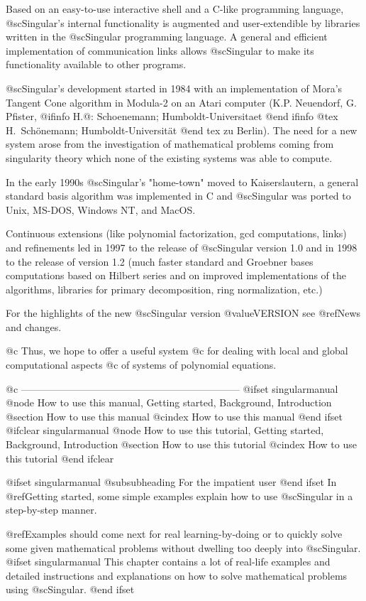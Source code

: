 Based on an easy-to-use interactive shell and a C-like programming
language, @sc{Singular}'s internal functionality is augmented and
user-extendible by libraries written in the @sc{Singular} programming
language. A general and efficient implementation of communication links
allows @sc{Singular} to make its functionality available to other
programs.

@sc{Singular}'s development started in 1984 with an implementation of
Mora's Tangent Cone algorithm in Modula-2 on an Atari computer (K.P.
Neuendorf, G. Pfister,
@ifinfo
H.@: Schoenemann; Humboldt-Universitaet
@end ifinfo
@tex
H.\ Sch\"onemann; Humboldt-Universit\"at
@end tex
 zu Berlin).  The need for a new system arose from the investigation of
mathematical problems coming from singularity theory which none of the
existing systems was able to compute.

In the early 1990s @sc{Singular}'s "home-town" moved to
Kaiserslautern, a general standard basis algorithm was implemented in C
and @sc{Singular} was ported to Unix, MS-DOS, Windows NT, and MacOS.

Continuous extensions (like polynomial factorization, gcd computations,
links) and refinements led in 1997 to the release of @sc{Singular}
version 1.0 and in 1998 to the release of version 1.2
(much faster standard and Groebner bases computations based on Hilbert series
and on improved implementations of the algorithms,
libraries for primary decomposition, ring normalization, etc.)

For the highlights of the new @sc{Singular} version @value{VERSION} see @ref{News and changes}.

@c Thus, we hope to offer a useful system
@c for dealing with local and global computational aspects
@c of systems of polynomial equations.

@c ------------------------------------------------------------------
@ifset singularmanual
@node How to use this manual, Getting started, Background, Introduction
@section How to use this manual
@cindex How to use this manual
@end ifset
@ifclear singularmanual
@node How to use this tutorial, Getting started, Background, Introduction
@section How to use this tutorial
@cindex How to use this tutorial
@end ifclear

@ifset singularmanual
@subsubheading For the impatient user
@end ifset
In @ref{Getting started}, some simple examples explain how to use
@sc{Singular}  in a step-by-step manner.

@ref{Examples} should come next for real learning-by-doing or to quickly
solve some given mathematical problems without dwelling too deeply into
@sc{Singular}.
@ifset singularmanual
This chapter contains a lot of real-life examples and
detailed instructions and explanations on how to solve mathematical
problems using @sc{Singular}.
@end ifset

